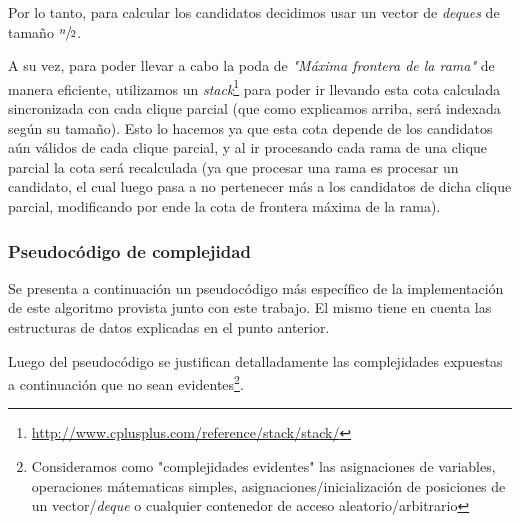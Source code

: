 \par Por lo tanto, para calcular los candidatos decidimos usar un vector de
    \emph{deques} de tama\~no $\sfrac{n}{2}$.

\par A su vez, para poder llevar a cabo la poda de \emph{"M\'axima frontera de
    la rama"} de manera eficiente, utilizamos un \emph{stack}\footnote{%
    \url{http://www.cplusplus.com/reference/stack/stack/}} para poder ir
    llevando esta cota calculada sincronizada con cada clique parcial (que
    como explicamos arriba, ser\'a indexada seg\'un su tama\~no). Esto lo
    hacemos ya que esta cota depende de los candidatos a\'un v\'alidos
    de cada clique parcial, y al ir procesando cada rama de una clique
    parcial la cota ser\'a recalculada (ya que procesar una rama es
    procesar un candidato, el cual luego pasa a no pertenecer m\'as a
    los candidatos de dicha clique parcial, modificando por ende la
    cota de frontera m\'axima de la rama).

\subsubsection{Pseudoc\'odigo de complejidad}
\par Se presenta a continuaci\'on un pseudoc\'odigo m\'as espec\'ifico de la implementaci\'on
    de este algoritmo provista junto con este trabajo. El mismo tiene en cuenta
    las estructuras de datos explicadas en el punto anterior.

\par Luego del pseudoc\'odigo se justifican detalladamente las complejidades
    expuestas a continuaci\'on que no sean evidentes\footnote{Consideramos
    como "complejidades evidentes" las asignaciones de variables, operaciones
    m\'atematicas simples, asignaciones/inicializaci\'on de posiciones de
    un vector/\emph{deque} o cualquier contenedor de acceso aleatorio/arbitrario}.

\bigskip

